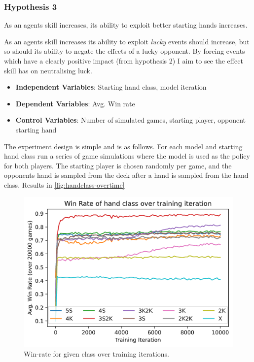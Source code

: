 \documentclass[../main.tex]{subfiles}
\begin{document}
\subsubsection{Hypothesis 3}
\begin{displayquote}
As an agents skill increases, its ability to exploit better starting hands increases.
\end{displayquote}

As an agents skill increases its ability to exploit \textit{lucky} events should increase, but so should its ability to negate the effects of a lucky opponent. By forcing events which have a clearly positive impact (from hypothesis 2) I aim to see the effect skill has on neutralising luck. 

\begin{itemize}[noitemsep]
    \item \textbf{Independent Variables}: Starting hand class, model iteration
    \item \textbf{Dependent Variables}: Avg. Win rate
    \item \textbf{Control Variables}: Number of simulated games, starting player, opponent starting hand
\end{itemize}

The experiment design is simple and is as follows. For each model and starting hand class run a series of game simulations where the model is used as the policy for both players. The starting player is chosen randomly per game, and the opponents hand is sampled from the deck after a hand is sampled from the hand class. Results in \autoref{fig:handclass-overtime}

\begin{figure}
    \centering
    \includegraphics[width=\textwidth,keepaspectratio]{images/results/handclassovertime.png}
    \caption{Win-rate for given class over training iterations.}
    \label{fig:handclass-overtime}
\end{figure}
\end{document}
